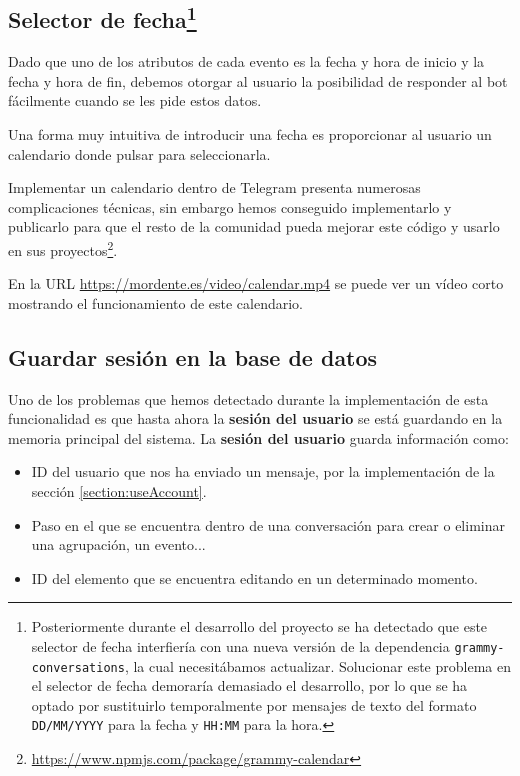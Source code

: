 \subsection{Selector de fecha\footnote{Posteriormente durante el desarrollo del proyecto se ha detectado que este selector de fecha interfiería con una nueva versión de la dependencia \texttt{grammy-conversations}, la cual necesitábamos actualizar. Solucionar este problema en el selector de fecha demoraría demasiado el desarrollo, por lo que se ha optado por sustituirlo temporalmente por mensajes de texto del formato \texttt{DD/MM/YYYY} para la fecha y \texttt{HH:MM} para la hora.}}\label{subsection:selectorCalendario}

Dado que uno de los atributos de cada evento es la fecha y hora de inicio y la fecha y hora de fin, debemos otorgar al usuario la posibilidad de responder al bot fácilmente cuando se les pide estos datos.

Una forma muy intuitiva de introducir una fecha es proporcionar al usuario un calendario donde pulsar para seleccionarla.

Implementar un calendario dentro de Telegram presenta numerosas complicaciones técnicas, sin embargo hemos conseguido implementarlo y publicarlo para que el resto de la comunidad pueda mejorar este código y usarlo en sus proyectos\footnote{\url{https://www.npmjs.com/package/grammy-calendar}}.

En la URL \url{https://mordente.es/video/calendar.mp4} se puede ver un vídeo corto mostrando el funcionamiento de este calendario.

\subsection{Guardar sesión en la base de datos}\label{subsection:adaptadorPrisma}


Uno de los problemas que hemos detectado durante la implementación de esta funcionalidad es que hasta ahora la \textbf{sesión del usuario} se está guardando en la memoria principal del sistema. La \textbf{sesión del usuario} guarda información como:

\begin{itemize}
    \item ID del usuario que nos ha enviado un mensaje, por la implementación de la sección \ref{section:useAccount}.
    \item Paso en el que se encuentra dentro de una conversación para crear o eliminar una agrupación, un evento...
    \item ID del elemento que se encuentra editando en un determinado momento.
\end{itemize}

